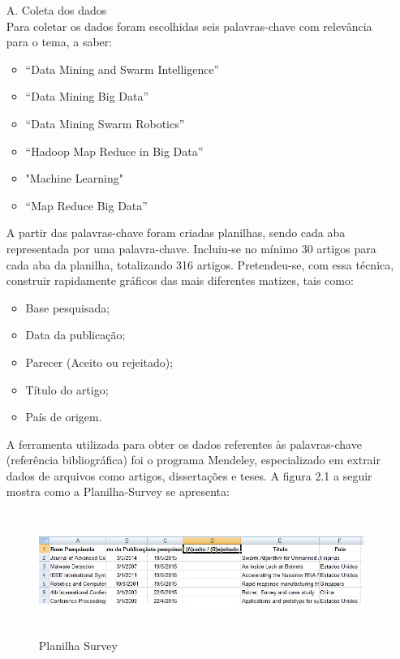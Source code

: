 \begin{enumerate}
 \item[A.] Coleta dos dados\\
    Para coletar os dados foram escolhidas seis palavras-chave com relevância para o tema, a saber:
    \begin{itemize}
      \item “Data Mining and Swarm Intelligence”
      \item “Data Mining Big Data”
      \item “Data Mining Swarm Robotics”
      \item “Hadoop Map Reduce in Big Data”    
      \item "Machine Learning"
      \item “Map Reduce Big Data”
    \end{itemize}


    A partir das palavras-chave foram criadas planilhas, sendo cada aba representada por uma palavra-chave. 
    Incluiu-se no mínimo 30 artigos para cada aba da planilha, totalizando 316 artigos.
    Pretendeu-se, com essa técnica, construir rapidamente gráficos das mais diferentes matizes, tais como:
    \begin{itemize}
      \item Base pesquisada;
      \item Data da publicação;
      \item Parecer (Aceito ou rejeitado);
      \item Título do artigo;
      \item País de origem.
    \end{itemize}

    A ferramenta utilizada para obter os dados referentes às palavras-chave (referência bibliográfica) foi o programa Mendeley, especializado 
    em extrair dados de arquivos como artigos, dissertações e teses.
    A figura 2.1 a seguir mostra como a Planilha-Survey se apresenta:
  
    \begin{figure}[!ht]
      \centering %
      \caption{Planilha Survey}
      \includegraphics[width=110mm, height=40mm]{Figuras/BigData/PlanilhaSrvey.jpg}
    \end{figure}
  

\end{enumerate}
